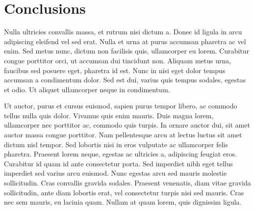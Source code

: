 \section{Conclusions}

Nulla ultricies convallis massa, et rutrum nisi dictum a. Donec id ligula in arcu adipiscing eleifend vel sed erat. Nulla et urna at purus accumsan pharetra ac vel enim. Sed metus nunc, dictum non facilisis quis, ullamcorper eu lorem. Curabitur congue porttitor orci, ut accumsan dui tincidunt non. Aliquam metus urna, faucibus sed posuere eget, pharetra id est. Nunc in nisi eget dolor tempus accumsan a condimentum dolor. Sed est dui, varius quis tempus sodales, egestas et odio. Ut aliquet ullamcorper neque in condimentum.

Ut auctor, purus et cursus euismod, sapien purus tempor libero, ac commodo tellus nulla quis dolor. Vivamus quis enim mauris. Duis magna lorem, ullamcorper nec porttitor ac, commodo quis turpis. In ornare auctor dui, sit amet auctor massa congue porttitor. Nam pellentesque arcu at lectus luctus sit amet dictum nisl tempor. Sed lobortis nisi in eros vulputate ac ullamcorper felis pharetra. Praesent lorem neque, egestas ac ultricies a, adipiscing feugiat eros. Curabitur id quam id ante consectetur porta. Sed imperdiet nibh eget tellus imperdiet sed varius arcu euismod. Nunc egestas arcu sed mauris molestie sollicitudin. Cras convallis gravida sodales. Praesent venenatis, diam vitae gravida sollicitudin, ante diam lobortis erat, vel consectetur turpis nisi sed mauris. Cras nec sem mauris, eu lacinia quam. Nullam at quam lorem, quis dignissim ligula.


